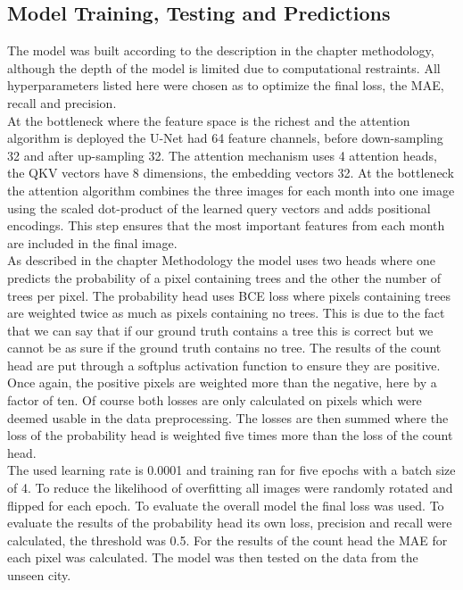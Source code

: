 \subsection{Model Training, Testing and Predictions}
The model was built according to the description in the chapter methodology, although the depth of the model is limited due to computational restraints. All hyperparameters listed here were chosen as to optimize the final loss, the MAE, recall and precision.
\\
At the bottleneck where the feature space is the richest and the attention algorithm is deployed the U-Net had 64 feature channels, before down-sampling 32 and after up-sampling 32. The attention mechanism uses 4 attention heads, the QKV vectors have 8 dimensions, the embedding vectors 32. At the bottleneck the attention algorithm combines the three images for each month into one image using the scaled dot-product of the learned query vectors and adds positional encodings. This step ensures that the most important features from each month are included in the final image. 
\\
As described in the chapter Methodology the model uses two heads where one predicts the probability of a pixel containing trees and the other the number of trees per pixel. The probability head uses BCE loss where pixels containing trees are weighted twice as much as pixels containing no trees. This is due to the fact that we can say that if our ground truth contains a tree this is correct but we cannot be as sure if the ground truth contains no tree. The results of the count head are put through a softplus activation function to ensure they are positive. Once again, the positive pixels are weighted more than the negative, here by a factor of ten. Of course both losses are only calculated on pixels which were deemed usable in the data preprocessing. The losses are then summed where the loss of the probability head is weighted five times more than the loss of the count head. 
\\
The used learning rate is 0.0001 and training ran for five epochs with a batch size of 4. To reduce the likelihood of overfitting all images were randomly rotated and flipped for each epoch. To evaluate the overall model the final loss was used. To evaluate the results of the probability head its own loss, precision and recall were calculated, the threshold was 0.5. For the results of the count head the MAE for each pixel was calculated. The model was then tested on the data from the unseen city. 
